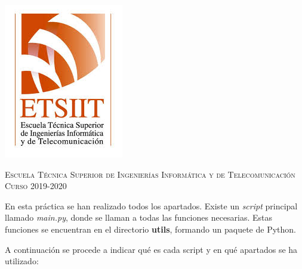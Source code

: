 \documentclass[11pt,a4paper]{article}
\begin{document}
\begin{titlepage}
\begin{minipage}{\textwidth}
\includegraphics[scale=0.3]{img/etsiit.jpeg}

\vspace{0.7cm}
\textsc{Escuela Técnica Superior de Ingenierías Informática y de Telecomunicación}\\
\vspace{1cm}
\textsc{Curso 2019-2020}
\end{minipage}
\end{titlepage}


\setlength{\parskip}{1em}

En esta práctica se han realizado todos los apartados. Existe un \textit{script} principal llamado \textit{main.py},
donde se llaman a todas las funciones necesarias. Estas funciones se encuentran en el directorio \textbf{utils}, formando
un paquete de Python.

A continuación se procede a indicar qué es cada script y en qué apartados se ha utilizado:
\end{document}
